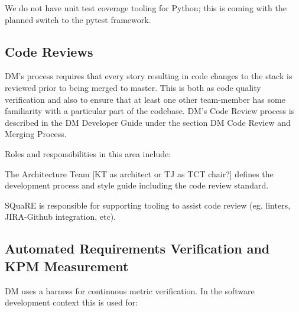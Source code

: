\begin{note} We do not have unit test coverage tooling for Python; this is coming with the planned switch to the pytest framework. \end{note}

\subsection{Code Reviews}

DM’s process requires that every story resulting in code changes to the stack is reviewed prior to being merged to master. This is both as code quality verification and also to ensure that at least one other team-member has some familiarity with a particular part of the codebase. DM’s Code Review process is described in the DM Developer Guide under the section DM Code Review and Merging Process.

Roles and responsibilities in this area include:

\begin{itemize_single}

\item The Architecture Team [KT as architect or TJ as TCT chair?] defines the development process and style guide including the code review standard.

\item SQuaRE is responsible for supporting tooling to assist code review (eg. linters, JIRA-Github integration, etc). 

\end{itemize_single}
  
\subsection{Automated Requirements Verification and KPM Measurement}

DM uses a harness for continuous metric verification. In the software development context this is used for:


